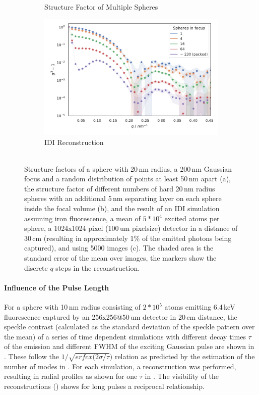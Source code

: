 \begin{figure}
\begin{subfigure}[b]{0.32\textwidth}
		\caption{Structure Factor of Multiple Spheres}
		\label{fig:multisphere3}
	\end{subfigure}
	\begin{subfigure}[b]{0.32\textwidth}
		\includegraphics[width=\linewidth]{images/multisphere2.pdf}
		\caption{IDI Reconstruction \\ $ $}
		\label{fig:multisphere2}
	\end{subfigure}
\caption[Structure factors and reconstructions for multiple spherical samples]{Structure factors of a sphere with 20\,nm radius, a 200\,nm Gaussian focus and a random distribution of points at least 50\,nm apart (a), the structure factor of different numbers of hard 20\,nm radius spheres with an additional 5\,nm separating layer on each sphere inside the focal volume (b), and the result of an IDI simulation assuming iron fluorescence, a mean of $5*10^4$ excited atoms per sphere, a 1024x1024 pixel (100\,um pixelsize) detector in a distance of 30\,cm (resulting in approximately 1\% of the emitted photons being captured), and using 5000 images (c). The shaded area is the standard error of the mean over images, the markers show the discrete $q$ steps in the reconstruction.}

\end{figure}


\paragraph{Influence of the Pulse Length}
For a sphere with 10\,nm radius consisting of $2*10^5$ atoms emitting 6.4\,keV fluorescence captured by an 256x256@50\,um detector in 20\,cm distance, the speckle contrast (calculated as the standard deviation of the speckle pattern over the mean) of a series of time dependent simulations with different decay times $\tau$ of the emission and different FWHM of the exciting Gaussian pulse are shown in .  These follow the $1/\sqrt{erfcx(2\sigma/\tau})$ relation as predicted by the estimation of the number of modes in .  For each simulation, a reconstruction was performed, resulting in radial profiles as shown for one $\tau$ in .  The visibility of the reconstructions () shows for long pulses a reciprocal relationship.

